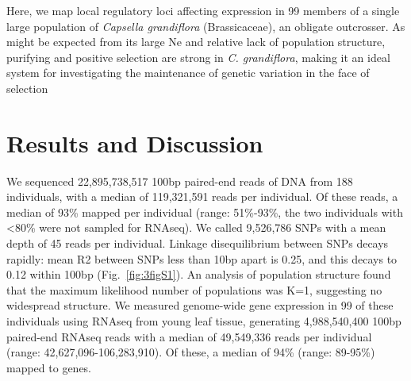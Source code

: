 Here, we map local regulatory loci affecting expression in 99 members of a single large population of \textit{Capsella grandiflora} (Brassicaceae), an obligate outcrosser. As might be expected from its large Ne and relative lack of population structure, purifying and positive selection are strong in \textit{C. grandiflora}\citep{Williamson2014-tf,St_onge2011-jz}, making it an ideal system for investigating the maintenance of genetic variation in the face of selection 

\section{Results and Discussion}
We sequenced 22,895,738,517 100bp paired-end reads of DNA from 188 individuals, with a median of 119,321,591 reads per individual. Of these reads, a median of 93\% mapped per individual (range: 51\%-93\%, the two individuals with \textless 80\% were not sampled for RNAseq). We called 9,526,786 SNPs with a mean depth of 45 reads per individual. Linkage disequilibrium between SNPs decays rapidly: mean R2 between SNPs less than 10bp apart is 0.25, and this decays to 0.12 within 100bp (Fig.~\ref{fig:3figS1}). An analysis of population structure \citep{Raj2014-im} found that the maximum likelihood number of populations was K=1, suggesting no widespread structure. We measured genome-wide gene expression in 99 of these individuals using RNAseq from young leaf tissue, generating 4,988,540,400 100bp paired-end RNAseq reads with a median of 49,549,336 reads per individual (range: 42,627,096-106,283,910). Of these, a median of 94\% (range: 89-95\%) mapped to genes. 

